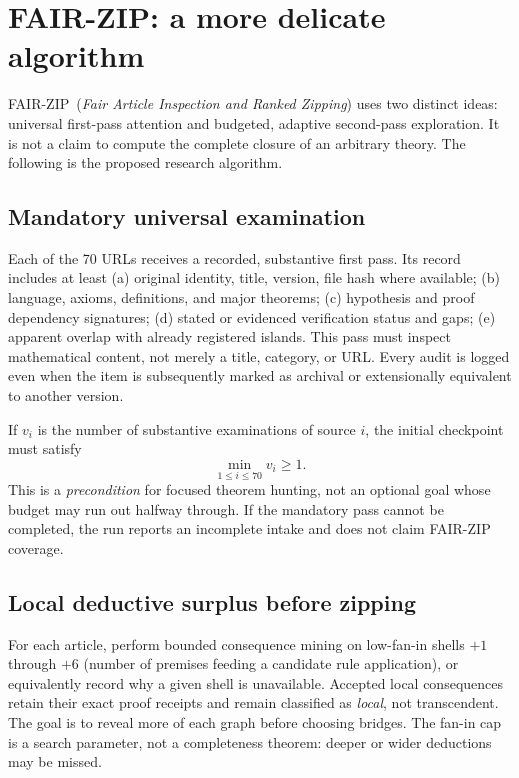 \documentclass[11pt,letterpaper]{article}
\newcommand{\Fair}{\textsc{FAIR-ZIP}}
\begin{document}
\section{FAIR-ZIP: a more delicate algorithm}
\Fair\ (\emph{Fair Article Inspection and Ranked Zipping}) uses two distinct ideas: universal first-pass attention and budgeted, adaptive second-pass exploration. It is not a claim to compute the complete closure of an arbitrary theory. The following is the proposed research algorithm.

\subsection{Mandatory universal examination}
Each of the 70 URLs receives a recorded, substantive first pass. Its record includes at least (a) original identity, title, version, file hash where available; (b) language, axioms, definitions, and major theorems; (c) hypothesis and proof dependency signatures; (d) stated or evidenced verification status and gaps; (e) apparent overlap with already registered islands. This pass must inspect mathematical content, not merely a title, category, or URL. Every audit is logged even when the item is subsequently marked as archival or extensionally equivalent to another version.

If $v_i$ is the number of substantive examinations of source $i$, the initial checkpoint must satisfy
\[
\boxed{\min_{1\le i\le 70}v_i\ge 1.}
\]
This is a \emph{precondition} for focused theorem hunting, not an optional goal whose budget may run out halfway through. If the mandatory pass cannot be completed, the run reports an incomplete intake and does not claim FAIR-ZIP coverage.

\subsection{Local deductive surplus before zipping}
For each article, perform bounded consequence mining on low-fan-in shells $+1$ through $+6$ (number of premises feeding a candidate rule application), or equivalently record why a given shell is unavailable. Accepted local consequences retain their exact proof receipts and remain classified as \emph{local}, not transcendent. The goal is to reveal more of each graph before choosing bridges. The fan-in cap is a search parameter, not a completeness theorem: deeper or wider deductions may be missed.
\end{document}
